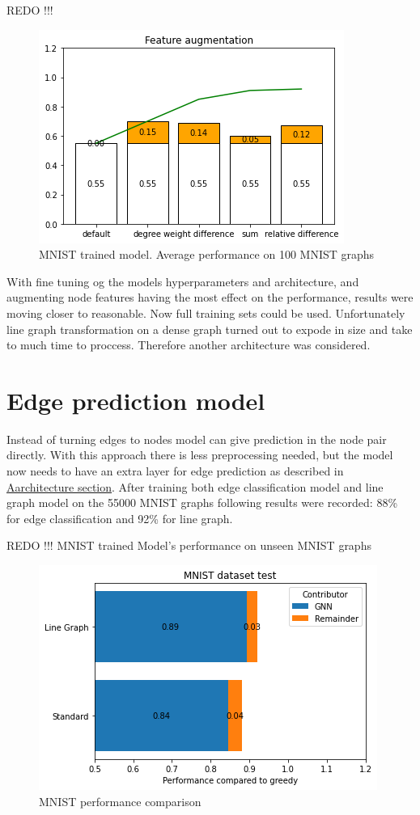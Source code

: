 REDO !!!
\begin{figure}[H]
    \centering
    \includegraphics[scale=1.0]{figures/FeatureAugmentationLine}
    \caption{MNIST trained model. Average performance on 100 MNIST graphs}
    \label{Feature Augmentation Effect}
\end{figure}

With fine tuning og the models hyperparameters and architecture, and augmenting node features having the most effect on the performance, results were moving closer to reasonable. Now full training sets could be used. Unfortunately line graph transformation on a dense graph turned out to expode in size and take to much time to proccess. Therefore another architecture was considered.
 
\section{Edge prediction model}

Instead of turning edges to nodes model can give prediction in the node pair directly. With this approach there is less preprocessing needed, but the model now needs to have an extra layer for edge prediction as described in \hyperref[sec:architecture]{Aarchitecture section}.
After training both edge classification model and line graph model on the 55000 MNIST graphs following results were recorded: 88\% for edge classification and 92\% for line graph.

REDO !!! MNIST trained Model's performance on unseen MNIST graphs
\begin{figure}[H]
    \centering
    \includegraphics[scale=1.0]{figures/FinalPerformanceMNIST}
    \caption{MNIST performance comparison}
    \label{Model performance on MNIST}
\end{figure}

